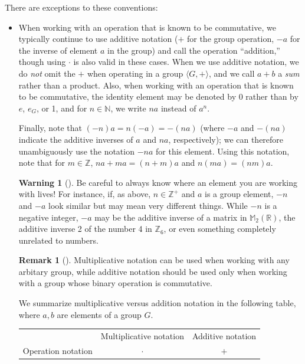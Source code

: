 \documentclass[10pt,]{book}
\theoremstyle{plain}
\theoremstyle{definition}
\theoremstyle{definition}
\newtheorem{remark}[theorem]{Remark}
\newtheorem{warning}[theorem]{Warning}
\theoremstyle{definition}
\theoremstyle{definition}
\numberwithin{equation}{section}
\newcommand{\hrulemedium}{\noalign{\hrule height 0.07em}}
\def\Z{\mathbb{Z}}
\def\R{\mathbb{R}}
\def\N{\mathbb{N}}
\def\M{\mathbb{M}}
\begin{document}
There are exceptions to these conventions: \leavevmode%
\begin{itemize}[label=\textbullet]
\item{}When working with an operation that is known to be commutative, we typically continue to use additive notation (\(+\) for the group operation, \(-a\) for the inverse of element \(a\) in the group) and call the operation ``addition,'' though using \(\cdot\) is also valid in these cases. When we use additive notation, we do \emph{not} omit the \(+\) when operating in a group \(\langle G,+\rangle\), and we call \(a+b\) a \emph{sum} rather than a product. Also, when working with an operation that is known to be commutative, the identity element may be denoted by 0 rather than by \(e\), \(e_G\), or 1, and for \(n\in \N\), we write \(na\) instead of \(a^n\).%
\par
Finally, note that \((-n)a=n(-a)=-(na)\) (where \(-a\) and \(-(na)\) indicate the additive inverses of \(a\) and \(na\), respectively); we can therefore unambiguously use the notation \(-na\) for this element. Using this notation, note that for \(m\in \Z\), \(na+ma=(n+m)a\) and \(n(ma)=(nm)a\).%
\par
\begin{warning}[]\label{warning-10}
Be careful to always know where an element you are working with lives! For instance, if, as above, \(n\in
\Z^+\) and \(a\) is a group element, \(-n\) and \(-a\) look similar but may mean very different things. While \(-n\) is a negative integer, \(-a\) may be the additive inverse of a matrix in \(\M_2(\R)\), the additive inverse 2 of the number 4 in \(\Z_6\), or even something completely unrelated to numbers.%
\end{warning}
%
\par
\begin{remark}[]\label{remark-9}
Multiplicative notation can be used when working with any arbitary group, while additive notation should be used only when working with a group whose binary operation is commutative.%
\end{remark}
%
\par
We summarize multiplicative versus addition notation in the following table, where \(a,b\) are elements of a group \(G\).%
\par
\begin{tabular}{lll}
\multicolumn{1}{c}{}&\multicolumn{1}{c}{Multiplicative notation}&\multicolumn{1}{c}{Additive notation}\tabularnewline\hrulemedium
Operation notation&\multicolumn{1}{c}{\(\cdot\)}&\multicolumn{1}{c}{\(+\)}\tabularnewline[0pt]

\end{tabular}
\end{itemize}
\end{document}
